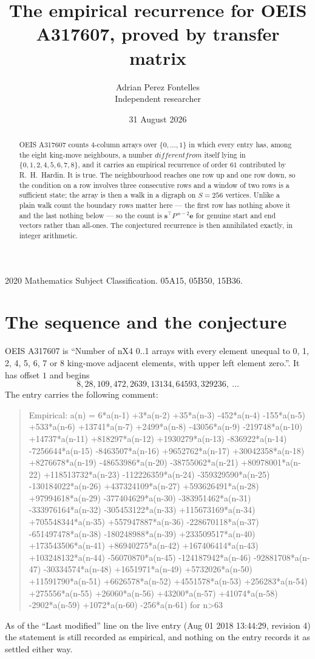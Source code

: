 \documentclass[11pt,a4paper]{article}
\title{The empirical recurrence for OEIS A317607, proved by transfer matrix}
\author{Adrian Perez Fontelles\\ \small Independent researcher}
\date{31 August 2026}
\theoremstyle{plain}
\theoremstyle{definition}
\begin{document}
\maketitle

\begin{abstract}
OEIS A317607 counts $4$-column arrays over $\{0,\dots,1\}$ in which every entry has,
among the eight king-move neighbours, a number $different from$ itself lying in $\{0,1,2,4,5,6,7,8\}$, and it carries an empirical
recurrence of order $61$ contributed by R.~H.~Hardin. It is true. The neighbourhood
reaches one row up and one row down, so the condition on a row involves three consecutive
rows and a window of two rows is a sufficient state; the array is then a walk in a digraph
on $S=256$ vertices. Unlike a plain walk count the boundary rows matter here --- the first
row has nothing above it and the last nothing below --- so the count is
$\mathbf{s}^{\!\top}P^{\,n-2}\mathbf{e}$ for genuine start and end vectors rather than
all-ones. The conjectured recurrence is then annihilated exactly, in integer arithmetic.
\end{abstract}

\noindent\small 2020 Mathematics Subject Classification. 05A15, 05B50, 15B36.\normalsize

\section{The sequence and the conjecture}

OEIS A317607 is ``Number of nX4 0..1 arrays with every element unequal to 0, 1, 2, 4, 5, 6, 7 or 8 king-move adjacent elements, with upper left element zero.''. It has offset
$1$ and begins
\[
8, 28, 109, 472, 2639, 13134, 64593, 329236,\ \dots
\]
The entry carries the following comment:
\begin{quote}\small
Empirical: a(n) = 6*a(n-1) +3*a(n-2) +35*a(n-3) -452*a(n-4) -155*a(n-5) +533*a(n-6) +13741*a(n-7) +2499*a(n-8) -43056*a(n-9) -219748*a(n-10) +14737*a(n-11) +818297*a(n-12) +1930279*a(n-13) -836922*a(n-14) -7256644*a(n-15) -8463507*a(n-16) +9652762*a(n-17) +30042358*a(n-18) +8276678*a(n-19) -48653986*a(n-20) -38755062*a(n-21) +80978001*a(n-22) +118513732*a(n-23) -112226359*a(n-24) -359329590*a(n-25) -130184022*a(n-26) +437324109*a(n-27) +593626491*a(n-28) +97994618*a(n-29) -377404629*a(n-30) -383951462*a(n-31) -333976164*a(n-32) -305453122*a(n-33) +115673169*a(n-34) +705548344*a(n-35) +557947887*a(n-36) -228670118*a(n-37) -651497478*a(n-38) -180248988*a(n-39) +233509517*a(n-40) +173543506*a(n-41) +86940275*a(n-42) +167406414*a(n-43) +103248132*a(n-44) -56070870*a(n-45) -124187942*a(n-46) -92881708*a(n-47) -30334574*a(n-48) +1651971*a(n-49) +5732026*a(n-50) +11591790*a(n-51) +6626578*a(n-52) +4551578*a(n-53) +256283*a(n-54) +275556*a(n-55) +26060*a(n-56) +43200*a(n-57) +41074*a(n-58) -2902*a(n-59) +1072*a(n-60) -256*a(n-61) for n>63
\end{quote}
As of the ``Last modified'' line on the live entry (Aug 01 2018 13:44:29, revision
4) the statement is still recorded as empirical, and nothing on the entry
records it as settled either way.
\end{document}
